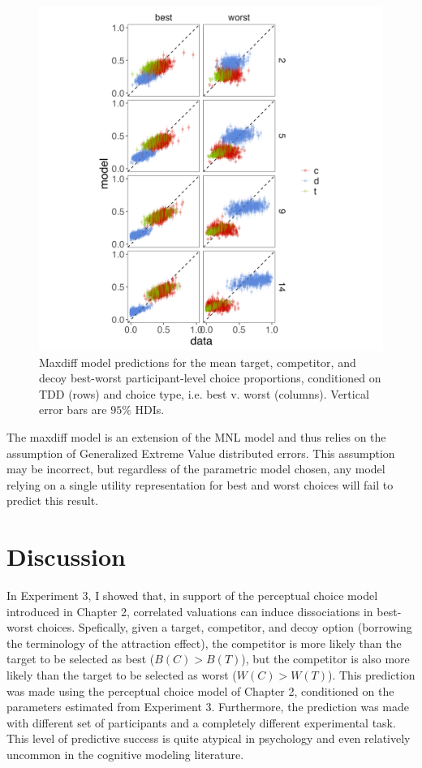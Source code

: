 \begin{figure}
   \includegraphics[width=\linewidth]{figures/maxdiff_2_subjectmeans_model_v_data.jpeg}
   \caption{Maxdiff model predictions for the mean target, competitor, and decoy best-worst participant-level choice proportions, conditioned on TDD (rows) and choice type, i.e. best v. worst (columns). Vertical error bars are $95\%$ HDIs.}
   \label{fig:maxdiff_sub_preds}
\end{figure}

The maxdiff model is an extension of the MNL model and thus relies on the assumption of Generalized Extreme Value distributed errors. This assumption may be incorrect, but regardless of the parametric model chosen, any model relying on a single utility representation for best and worst choices will fail to predict this result. 

\section{Discussion}
In Experiment 3, I showed that, in support of the perceptual choice model introduced in Chapter 2, correlated valuations can induce dissociations in best-worst choices. Spefically, given a target, competitor, and decoy option (borrowing the terminology of the attraction effect), the competitor is more likely than the target to be selected as best ($B(C)>B(T)$), but the competitor is also more likely than the target to be selected as worst ($W(C)>W(T)$). This prediction was made using the perceptual choice model of Chapter 2, conditioned on the parameters estimated from Experiment 3. Furthermore, the prediction was made with different set of participants and a completely different experimental task. This level of predictive success is quite atypical in psychology and even relatively uncommon in the cognitive modeling literature. 

